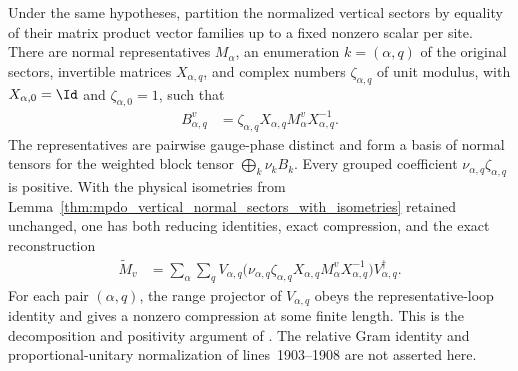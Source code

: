 \begin{lemma}
    \label{thm:mpdo_vertical_bnt_grouping_with_isometries}
    \leanok
    Under the same hypotheses, partition the normalized vertical sectors by
    equality of their matrix product vector families up to a fixed nonzero
    scalar per site. There are normal representatives $M_\alpha$, an enumeration
    $k=(\alpha,q)$ of the original sectors, invertible matrices
    $X_{\alpha,q}$, and complex numbers $\zeta_{\alpha,q}$ of unit modulus,
    with $X_{\alpha,0}=\Id$ and $\zeta_{\alpha,0}=1$, such that
    \begin{align}
        B_{\alpha,q}^v
         & =\zeta_{\alpha,q}X_{\alpha,q}
        M_\alpha^vX_{\alpha,q}^{-1}.
        \label{eq:mpdo_vertical_gauge_phase}
    \end{align}
    The representatives are pairwise gauge-phase distinct and form a basis of
    normal tensors for the weighted block tensor
    $\bigoplus_k\nu_kB_k$. Every grouped coefficient
    $\nu_{\alpha,q}\zeta_{\alpha,q}$ is positive. With the physical isometries
    from Lemma~\ref{thm:mpdo_vertical_normal_sectors_with_isometries}
    retained unchanged, one has both reducing identities, exact compression,
    and the exact reconstruction
    \begin{align}
        \widetilde M_v
         & =\sum_\alpha\sum_q
        V_{\alpha,q}
        \bigl(\nu_{\alpha,q}\zeta_{\alpha,q}
        X_{\alpha,q}M_\alpha^vX_{\alpha,q}^{-1}\bigr)
        V_{\alpha,q}^\dagger.
        \label{eq:mpdo_vertical_grouped_reconstruction}
    \end{align}
    For each pair $(\alpha,q)$, the range projector of $V_{\alpha,q}$ obeys
    the representative-loop identity and gives a nonzero compression at some
    finite length. This is the decomposition and positivity argument of
    \cite[Proposition~4.13, lines 1898--1902]{Cirac2016MPDO_arXiv}. The
    relative Gram identity and proportional-unitary normalization of
    lines~1903--1908 are not asserted here.
\end{lemma}

